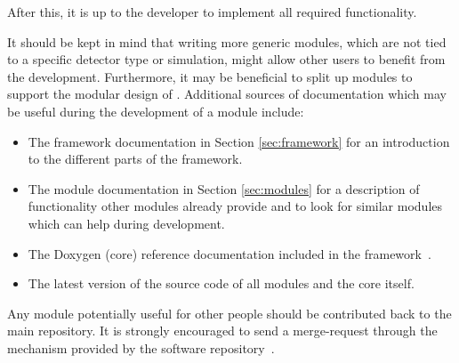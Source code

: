 After this, it is up to the developer to implement all required functionality.

It should be kept in mind that writing more generic modules, which are not tied to a specific detector type or simulation, might allow other users to benefit from the development.
Furthermore, it may be beneficial to split up modules to support the modular design of \apsq.
Additional sources of documentation which may be useful during the development of a module include:
\begin{itemize}
\item The framework documentation in Section \ref{sec:framework} for an introduction to the different parts of the framework.
\item The module documentation in Section \ref{sec:modules} for a description of functionality other modules already provide and to look for similar modules which can help during development.
\item The Doxygen (core) reference documentation included in the framework~\cite{ap2-doxygen}.
\item The latest version of the source code of all modules and the \apsq core itself.
\end{itemize}

Any module potentially useful for other people should be contributed back to the main repository.
It is strongly encouraged to send a merge-request through the mechanism provided by the software repository~\cite{ap2-repo}.

